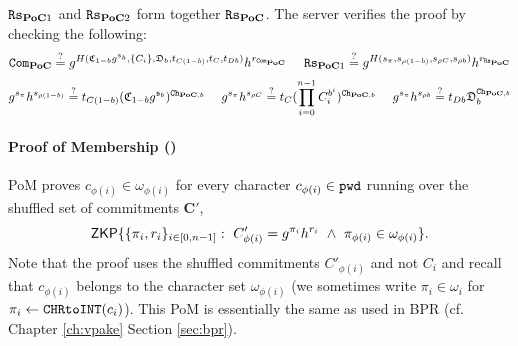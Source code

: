 \noindent
$\mathtt{Rs}_{\mathsf{\bf PoC}1}$ and $\mathtt{Rs}_{\mathsf{\bf PoC}2}$ form together $\mathtt{Rs}_{\mathsf{\bf PoC}}$.
The server verifies the proof by checking the following:
\[
  \mathtt{Com}_{\mathsf{\bf PoC}} \stackrel{?}{=} g^{H(\mathfrak{C}_{1-b}g^{\mathfrak{s}_b}, \{C_i\}, \mathfrak{D}_b, t_{C(1-b)}, t_C, t_{Db})} h^{r_{\mathtt{Com}_{\mathsf{\bf PoC}}}} ~~~~
  \mathtt{Rs}_{\mathsf{\bf PoC}1} \stackrel{?}{=} g^{H(s_{\pi}, s_{\rho (1-b)}, s_{\rho C}, s_{\rho b})} h^{r_{\mathtt{Rs}_{\mathsf{\bf PoC}}}}
\]
\[
  g^{s_{\pi}}h^{s_{\rho (1-b)}} \stackrel{?}{=} t_{C(1-b)}(\mathfrak{C}_{1-b}g^{\mathfrak{s}_b})^{\mathtt{Ch}_{\mathsf{\bf PoC},b}} ~~~~
  g^{s_{\pi}}h^{s_{\rho C}} \stackrel{?}{=} t_{C}(\prod_{i=0}^{n-1} C_i^{b^i})^{\mathtt{Ch}_{\mathsf{\bf PoC},b}} ~~~~
  g^{s_{\pi}}h^{s_{\rho b}} \stackrel{?}{=} t_{Db}\mathfrak{D}_{b}^{\mathtt{Ch}_{\mathsf{\bf PoC},b}}
\]

\paragraph{Proof of Membership (\PoM)}
\ac{PoM} proves $c_{\phi(i)}\in\omega_{\phi(i)}$ for every character $c_{\phi(i)}\in\mathtt{pwd}$ running over the shuffled set of commitments $\bm C'$, \ie
\begin{equation*}
\mathsf{ZKP}\{\{\pi_i,r_i\}_{i\in[0,n-1]} : ~ C'_{\phi(i)}=g^{\pi_{i}}h^{r_{i}} ~ \wedge ~ \pi_{\phi(i)}\in \omega_{\phi(i)}\}.
\end{equation*}
Note that the proof uses the shuffled commitments $C'_{\phi(i)}$ and not $C_i$ and recall that $c_{\phi(i)}$ belongs to the character set $\omega_{\phi(i)}$ (we sometimes write $\pi_i\in\omega_i$ for $\pi_i\gets\texttt{CHRtoINT}(c_i)$).
This \ac{PoM} is essentially the same as used in \ac{BPR} (cf. Chapter \ref{ch:vpake} Section \ref{sec:bpr}).

